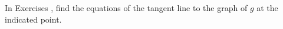 {\noindent In Exercises}
{, find the equations of the tangent line %
to the graph of $g$ at the indicated point.
}
